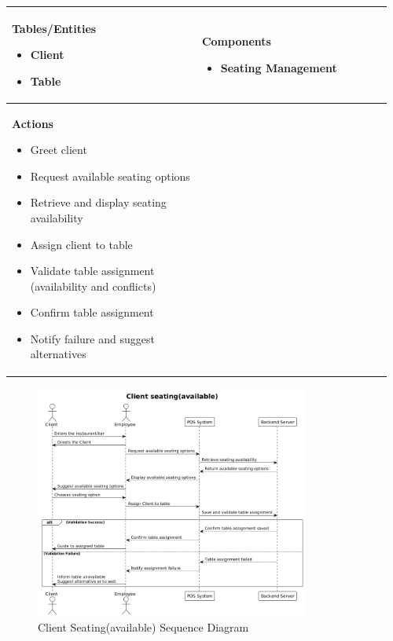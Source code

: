 \documentclass[]{VUMIFTemplateClass}
\newenvironment{mpitemlist}[1][\linewidth]{%
    \begin{minipage}[t]{#1}%
        \setlength{\leftmargini}{12pt}%
        \begin{itemize}%
            \setlength{\itemsep}{1pt}%
            \setlength{\parskip}{0pt}%
            \setlength{\parsep}{0pt}%
}{%
        \end{itemize}%
    \end{minipage}\newline
}
\begin{document}
\begin{center}
\setlength{\tabcolsep}{8pt}
\begin{tabular}{|p{0.48\linewidth}|p{0.48\linewidth}|}
\hline
\textbf{Tables/Entities} \newline
\begin{mpitemlist}
\item Client
\item Table
\end{mpitemlist}
&
\textbf{Components} \newline
\begin{mpitemlist}
\item Seating Management
\end{mpitemlist}
\\ \hline
\textbf{Actions} \newline
\begin{mpitemlist}
    \item Greet client
    \item Request available seating options
    \item Retrieve and display seating availability
    \item Assign client to table
    \item Validate table assignment (availability and conflicts)
    \item Confirm table assignment
    \item Notify failure and suggest alternatives
\end{mpitemlist}
&
\\ \hline
\end{tabular}
\end{center}

\begin{figure}[H]
    \centering
    \includegraphics[width=0.8\textwidth]{images/diagrams/orders/order_client_seating_available.png}
    \caption{Client Seating(available) Sequence Diagram}
    \label{fig:client_seating_available_sequence}
\end{figure}
\end{document}
